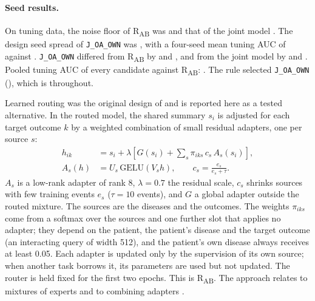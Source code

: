 \paragraph{Seed results.} On tuning data, the noise floor of
R\textsubscript{AB} was  and that of
the joint model . The design seed spread of
\texttt{J\_OA\_OWN} was , with a four-seed
mean tuning AUC of  against .
\texttt{J\_OA\_OWN} differed from R\textsubscript{AB} by 
and , and from the joint model by  and
. Pooled tuning AUC of every candidate against
R\textsubscript{AB}: . The rule selected
\texttt{J\_OA\_OWN} (), which
is \opera{} throughout.

\label{sec:router-variants}
\label{sec:learned-routing}
Learned routing was the original design of \opera{} and is reported here as a
tested alternative. In the routed model, the shared summary $s_i$ is adjusted
for each target outcome $k$ by a weighted combination of small residual
adapters, one per source $s$:
\begin{equation}
 \begin{aligned}
 h_{ik}&=s_i+\lambda\left[G(s_i)+\sum_s\pi_{iks}\,c_s\,A_s(s_i)\right],\\
 A_s(h)&=U_s\,\mathrm{GELU}(V_s h),
 \qquad c_s=\frac{e_s}{e_s+\tau}.
 \end{aligned}
 \label{eq:router}
\end{equation}
$A_s$ is a low-rank adapter of rank 8, $\lambda=0.7$ the residual scale, $c_s$
shrinks sources with few training events $e_s$ ($\tau=10$ events), and $G$ a
global adapter outside the routed mixture. The sources are the diseases and the
outcomes. The weights $\pi_{iks}$ come from a softmax over the sources and one
further slot that applies no adapter; they depend on the patient, the patient's
disease and the target outcome (an interacting query of width 512), and the
patient's own disease always receives at least 0.05. Each adapter is updated
only by the supervision of its own source; when another task borrows it, its
parameters are used but not updated. The router is held fixed for the first two
epochs. This is R\textsubscript{AB}. The approach relates to mixtures of
experts and to combining adapters
\citep{jacobs1991adaptive,ma2018mmoe,pfeiffer2021adapterfusion}.

